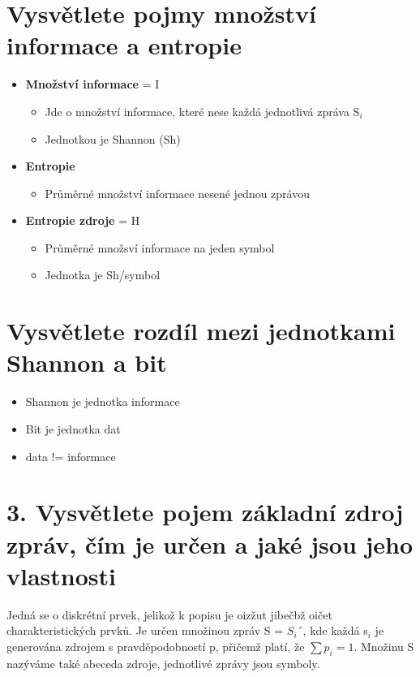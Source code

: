 \clearpage
\section{Vysvětlete pojmy množství informace a entropie}
\begin{itemize}
    \item \textbf{Množství informace} = I
    \begin{itemize}
        \item Jde o množství informace, které nese  každá jednotlivá zpráva S$_i$
        \item Jednotkou je Shannon (Sh)
    \end{itemize}
    \item \textbf{Entropie} 
    \begin{itemize}
        \item Průměrné množství informace nesené jednou zprávou
    \end{itemize}
    \item \textbf{Entropie zdroje} = H
    \begin{itemize}
        \item Průměrné množsví informace na jeden symbol
        \item Jednotka je Sh/symbol
    \end{itemize}
\end{itemize}

\section{ Vysvětlete rozdíl mezi jednotkami Shannon a bit}
\begin{itemize}
    \item Shannon je jednotka informace
    \item Bit je jednotka dat
    \item data != informace
\end{itemize}

\section{3.	Vysvětlete pojem základní zdroj zpráv, čím je určen a jaké jsou jeho vlastnosti}
Jedná se o diskrétní prvek, jelikož k popisu je oizžut jibečbž oičet charakteristických prvků.
Je určen množinou zpráv S = ${S_i}$´, kde každá s$_i$ je generována zdrojem s pravděpodobností p, přičemž platí, že $\sum p_i = 1$.
Množinu S nazýváme také abeceda zdroje, jednotlivé zprávy jsou symboly.

